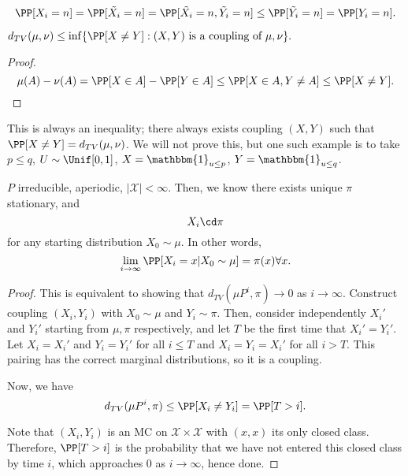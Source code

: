 \[\PP[X_i=n] = \PP[\tilde{X_i}=n] = \PP[\tilde{X_i}=n, \tilde{Y_i}=n]\leq \PP[\tilde{Y_i}=n] = \PP[Y_i=n].\]

\begin{theorem}
\proplabel

$d_{TV}(\mu, \nu) \leq \inf\{\PP[X\neq Y] : (X,Y)\text{ is a coupling of }\mu, \nu\}.$
\end{theorem}

\begin{proof}
\[\mu(A) - \nu(A) = \PP[X\in A] - \PP[Y\in A] \leq \PP[X\in A, Y\neq A]\leq \PP[X\neq Y].\]
\end{proof}

This is always an inequality; there always exists coupling $(X,Y)$ such that $\PP[X\neq Y] = d_{TV}(\mu, \nu)$. We will not prove this, but one such example is to take $p\leq q$, $U\sim \Unif[0,1]$, $X=\mathbbm{1}_{u\leq p}$, $Y=\mathbbm{1}_{u\leq q}$. 

\begin{theorem}

$P$ irreducible, aperiodic, $\vert \mathcal{X}\vert < \infty$. Then, we know there exists unique $\pi$ stationary, and 
\[X_i \cd \pi\]
for any starting distribution $X_0\sim \mu$. In other words, 
\[\lim_{i\rightarrow \infty}\PP[X_i=x|X_0\sim \mu] = \pi(x)\forall x.\]
\end{theorem}

\begin{proof}
	This is equivalent to showing that $d_{TV}(\mu P^i, \pi)\rightarrow 0$ as $i\rightarrow \infty$. Construct coupling $(X_i,Y_i)$ with $X_0\sim \mu$ and $Y_i\sim \pi$. Then, consider independently $X_i'$ and $Y_i'$ starting from $\mu, \pi$ respectively, and let $T$ be the first time that $X_i'=Y_i'$. Let $X_i=X_i'$ and $Y_i=Y_i'$ for all $i\leq T$ and $X_i=Y_i=X_i'$ for all $i > T$. This pairing has the correct marginal distributions, so it is a coupling. 

Now, we have 
\[d_{TV}(\mu P^i, \pi)\leq \PP[X_i\neq Y_i] = \PP[T > i].\]

Note that $(X_i,Y_i)$ is an MC on $\mathcal{X}\times \mathcal{X}$ with $(x,x)$ its only closed class. Therefore, $\PP[T>i]$ is the probability that we have not entered this closed class by time $i$, which approaches $0$ as $i\rightarrow \infty$, hence done. 
\end{proof}
